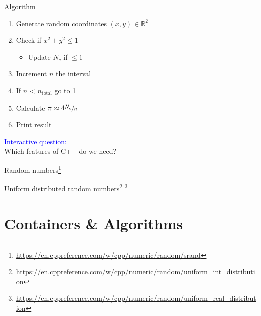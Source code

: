 \documentclass[12pt]{beamer}
\begin{document}
\begin{frame}{Algorithm}
\begin{enumerate}
\item Generate random coordinates $(x,y)\in \mathbb{R}^2$
\item Check if $x^2+y^2 \leq 1$
\begin{itemize}
\item Update $N_c$ if $\leq 1$
\end{itemize}
\item Increment $n$ the interval  
\item If $n$ < $n_{\text{total}}$ go to 1
\item Calculate $\pi \approx 4 \sfrac{N_c}{n}$
\item Print result
\end{enumerate}
\vspace{0.25cm}
\textcolor{blue}{Interactive question:} \\
\vspace{0.125cm}
Which features of C++ do we need? \\
\vspace{0.25cm}
\end{frame}

\begin{frame}{Random numbers\footnote{\tiny\url{https://en.cppreference.com/w/cpp/numeric/random/srand}}}



\end{frame}

\begin{frame}{Uniform distributed random numbers\footnote{\tiny\url{https://en.cppreference.com/w/cpp/numeric/random/uniform_int_distribution}} \footnote{\tiny\url{https://en.cppreference.com/w/cpp/numeric/random/uniform_real_distribution}}}



\end{frame}

\section{Containers \& Algorithms}
\end{document}
